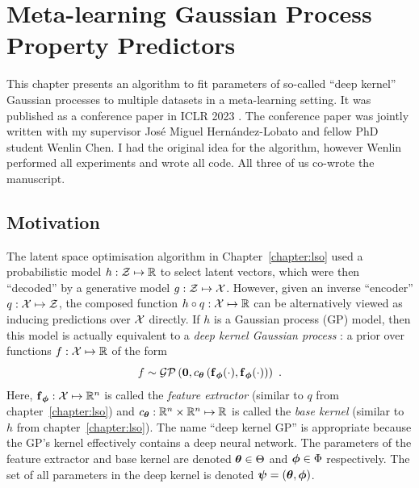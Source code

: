 \chapter{Meta-learning Gaussian Process Property Predictors}
\label{chapter:adkf}

\ifpdf
    \graphicspath{{chapter0x-ADKF/figures}}
\else
    \graphicspath{}
\fi

This chapter presents an algorithm to fit parameters of
so-called ``deep kernel'' Gaussian processes
to multiple datasets in a meta-learning setting.
It was published as a conference paper
in ICLR 2023 \citep{chen2022meta}.
The conference paper was jointly written with
my supervisor José Miguel Hernández-Lobato
and fellow PhD student Wenlin Chen.
I had the original idea for the algorithm,
however Wenlin performed all experiments and wrote all code.
All three of us co-wrote the manuscript.

\section{Motivation}
\label{sec:adkf:motivation}

The latent space optimisation algorithm in Chapter~\ref{chapter:lso}
used a probabilistic model $h:\mathcal{Z}\mapsto\mathbb{R}$
to select latent vectors, which were then ``decoded'' by a generative model $g:\mathcal{Z}\mapsto\mathcal{X}$.
However, given an inverse ``encoder'' $q:\mathcal{X}\mapsto\mathcal{Z}$,
the composed function $h\circ q: \mathcal{X}\mapsto\mathbb{R}$
can be alternatively viewed as inducing predictions over $\mathcal{X}$ directly.
If $h$ is a Gaussian process (GP) model,
then this model is actually equivalent to a 
\emph{deep kernel Gaussian process}
\citep{hinton2007using,wilson2016deep,bradshaw2017adversarial,calandra2016manifold,ober21a}:
a prior over functions $f:\mathcal{X}\mapsto\mathbb{R}$
of the form
\begin{equation*}
    f\sim \mathcal{GP}\left(
        \bm{0},
        c_{\operatorname{\boldsymbol{\theta}}}\left(\operatorname{\mathbf{f}}_{\operatorname{\boldsymbol{\phi}}}(\cdot), \operatorname{\mathbf{f}}_{\operatorname{\boldsymbol{\phi}}}(\cdot)\right)
    \right)\ .
\end{equation*}
Here, 
$\operatorname{\mathbf{f}}_{\operatorname{\boldsymbol{\phi}}}:\mathcal{X}\mapsto\mathbb{R}^n$ is called the
\emph{feature extractor} (similar to $q$ from chapter~\ref{chapter:lso})
and $c_{\operatorname{\boldsymbol{\theta}}}:\mathbb{R}^n\times\mathbb{R}^n\mapsto\mathbb{R}$
is called the 
\emph{base kernel} (similar to $h$ from chapter~\ref{chapter:lso}).
The name ``deep kernel GP'' is appropriate because the GP's
kernel effectively contains a deep neural network.
The parameters of the feature extractor and base kernel
are denoted $\operatorname{\boldsymbol{\theta}}\in\Theta$
and $\operatorname{\boldsymbol{\phi}}\in\Phi$
respectively.
The set of all parameters in the deep kernel is denoted
$\operatorname{\boldsymbol{\psi}}=(\operatorname{\boldsymbol{\theta}},\operatorname{\boldsymbol{\phi}})$.

